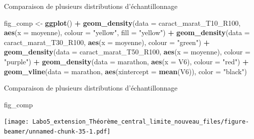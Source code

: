 \documentclass[ignorenonframetext,]{beamer}
\newenvironment{Shaded}{\begin{snugshade}}{\end{snugshade}}
\newcommand{\KeywordTok}[1]{\textcolor[rgb]{0.13,0.29,0.53}{\textbf{#1}}}
\newcommand{\DataTypeTok}[1]{\textcolor[rgb]{0.13,0.29,0.53}{#1}}
\newcommand{\StringTok}[1]{\textcolor[rgb]{0.31,0.60,0.02}{#1}}
\newcommand{\OperatorTok}[1]{\textcolor[rgb]{0.81,0.36,0.00}{\textbf{#1}}}
\newcommand{\NormalTok}[1]{#1}
\begin{document}
\begin{frame}[fragile]{Comparaison de plusieurs distributions
d'échantillonnage}

\begin{Shaded}
\begin{Highlighting}[]
\NormalTok{fig_comp <-}\StringTok{ }
\StringTok{  }\KeywordTok{ggplot}\NormalTok{() }\OperatorTok{+}
\StringTok{  }\KeywordTok{geom_density}\NormalTok{(}\DataTypeTok{data =}\NormalTok{ caract_marat_T10_R100, }\KeywordTok{aes}\NormalTok{(}\DataTypeTok{x =}\NormalTok{ moyenne), }\DataTypeTok{colour =} \StringTok{"yellow"}\NormalTok{, }\DataTypeTok{fill =} \StringTok{"yellow"}\NormalTok{) }\OperatorTok{+}
\StringTok{  }\KeywordTok{geom_density}\NormalTok{(}\DataTypeTok{data =}\NormalTok{ caract_marat_T30_R100, }\KeywordTok{aes}\NormalTok{(}\DataTypeTok{x =}\NormalTok{ moyenne), }\DataTypeTok{colour =} \StringTok{"green"}\NormalTok{) }\OperatorTok{+}
\StringTok{  }\KeywordTok{geom_density}\NormalTok{(}\DataTypeTok{data =}\NormalTok{ caract_marat_T50_R100, }\KeywordTok{aes}\NormalTok{(}\DataTypeTok{x =}\NormalTok{ moyenne), }\DataTypeTok{colour =} \StringTok{"purple"}\NormalTok{) }\OperatorTok{+}
\StringTok{  }\KeywordTok{geom_density}\NormalTok{(}\DataTypeTok{data =}\NormalTok{ marathon, }\KeywordTok{aes}\NormalTok{(}\DataTypeTok{x =}\NormalTok{ V6), }\DataTypeTok{colour =} \StringTok{"red"}\NormalTok{) }\OperatorTok{+}
\StringTok{  }\KeywordTok{geom_vline}\NormalTok{(}\DataTypeTok{data =}\NormalTok{ marathon, }\KeywordTok{aes}\NormalTok{(}\DataTypeTok{xintercept =} \KeywordTok{mean}\NormalTok{(V6)), }\DataTypeTok{color =} \StringTok{"black"}\NormalTok{)}
\end{Highlighting}
\end{Shaded}

\end{frame}

\begin{frame}[fragile]{Comparaison de plusieurs distributions
d'échantillonnage}

\begin{Shaded}
\begin{Highlighting}[]
\NormalTok{fig_comp }
\end{Highlighting}
\end{Shaded}

\texttt{[image: Labo5\_extension\_Théorème\_central\_limite\_nouveau\_files/figure-beamer/unnamed-chunk-35-1.pdf]}

\end{frame}
\end{document}
